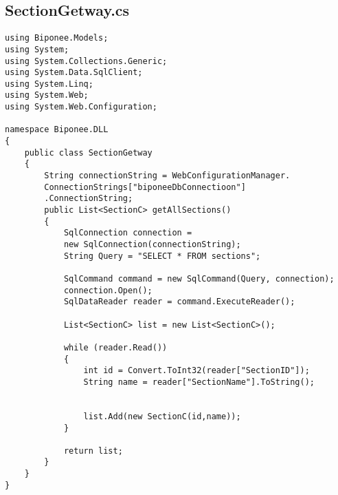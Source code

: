\subsection{SectionGetway.cs}
\begin{lstlisting}
using Biponee.Models;
using System;
using System.Collections.Generic;
using System.Data.SqlClient;
using System.Linq;
using System.Web;
using System.Web.Configuration;

namespace Biponee.DLL
{
    public class SectionGetway
    {
        String connectionString = WebConfigurationManager.
        ConnectionStrings["biponeeDbConnectioon"]
        .ConnectionString;
        public List<SectionC> getAllSections()
        {
            SqlConnection connection = 
            new SqlConnection(connectionString);
            String Query = "SELECT * FROM sections";

            SqlCommand command = new SqlCommand(Query, connection);
            connection.Open();
            SqlDataReader reader = command.ExecuteReader();

            List<SectionC> list = new List<SectionC>();

            while (reader.Read())
            {
                int id = Convert.ToInt32(reader["SectionID"]);
                String name = reader["SectionName"].ToString();
               

                list.Add(new SectionC(id,name));
            }

            return list;
        }
    }
}

\end{lstlisting}

\newpage

